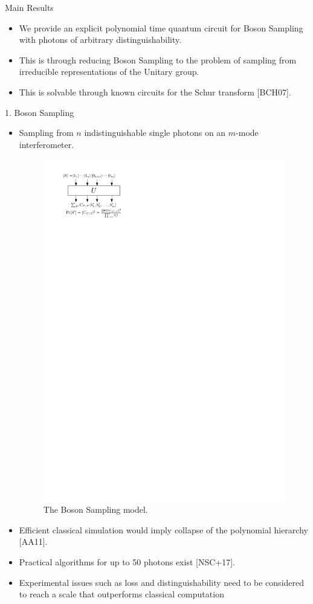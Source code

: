 \documentclass[]{templates/poster}
\begin{document}

\begin{frame}{} 

\begin{columns}[t]
  \begin{column}{0.422\linewidth}
  \begin{block}{\Large Main Results}
  \begin{itemize}
  \item We provide an explicit polynomial time quantum circuit for Boson Sampling with photons of arbitrary distinguishability.
  
  \item This is through reducing Boson Sampling to the problem of sampling from irreducible representations of the Unitary group.
  
  \item This is solvable through known circuits for the Schur transform [BCH07].
  \end{itemize}
  \end{block}

  \begin{block}{\Large 1. Boson Sampling}
  \begin{itemize}
  \item Sampling from $n$ indistinguishable single photons on an $m$-mode interferometer.
  \begin{center}
  \begin{figure}
  \includegraphics[width=0.4\linewidth]{model2}
  \caption{\label{fig:bs} The Boson Sampling model.}
  \end{figure}
  \end{center}
  \item Efficient classical simulation would imply collapse of the polynomial hierarchy [AA11].
  \item Practical algorithms for up to 50 photons exist [NSC+17].
  \item Experimental issues such as loss and distinguishability need to be considered to reach a scale that outperforms classical computation
  \end{itemize}
  \end{block}


\end{column}
\end{columns}
\end{frame}
\end{document}
